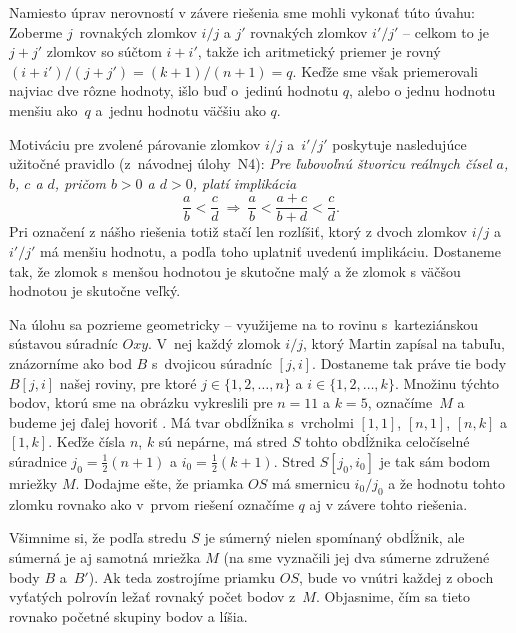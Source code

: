 {\poznamky
Namiesto úprav nerovností v závere riešenia sme mohli vykonať túto úvahu:
Zoberme $j$~rovnakých zlomkov $i/j$ a $j'$ rovnakých zlomkov $i'/j'$ --
celkom to je $j+j'$ zlomkov so súčtom $i+i'$, takže ich aritmetický priemer
je rovný $(i+i')/(j+j')=(k+1)/(n+1)=q$.
Keďže sme však priemerovali najviac dve rôzne hodnoty,
išlo buď o~jedinú hodnotu $q$, alebo o jednu hodnotu menšiu ako~$q$
a~jednu hodnotu väčšiu ako $q$.

Motiváciu pre zvolené párovanie zlomkov $i/j$ a~$i'/j'$
poskytuje nasledujúce užitočné pravidlo (z~návodnej úlohy~N4):
{\sl Pre ľubovoľnú štvoricu reálnych čísel $a$, $b$, $c$ a $d$, pričom $b>0$ a $d>0$, platí implikácia
}
\def\impl{\ \Rightarrow\ }
$$
\frac{a}{b}<\frac{c}{d}\impl
\frac{a}{b}<\frac{a+c}{b+d}<\frac{c}{d}.
$$
Pri označení z nášho riešenia totiž stačí len rozlíšiť, ktorý z dvoch zlomkov $i/j$ a~$i'/j'$ má menšiu hodnotu, a podľa toho
uplatniť uvedenú implikáciu. Dostaneme tak, že zlomok s menšou
hodnotou je skutočne malý a že zlomok s väčšou hodnotou
je skutočne veľký.

   \Jres
Na úlohu sa pozrieme geometricky -- využijeme na to rovinu
s~karteziánskou sústavou súradníc $Oxy$. V~nej každý
zlomok $i/j$, ktorý Martin zapísal na tabuľu, znázorníme ako bod $B$
s~dvojicou súradníc $[j,i]$.
Dostaneme tak práve tie body $B[j,i]$ našej roviny,
pre ktoré $j\in\{1,2,\dots,n\}$ a $i\in\{1,2,\dots,k\}$.
Množinu týchto bodov, ktorú sme na obrázku vykreslili pre $n=11$ a
$k=5$,
označíme~$M$ a budeme jej ďalej hovoriť . Má tvar obdĺžnika
s~vrcholmi $[1,1]$, $[n,1]$, $[n,k]$ a $[1,k]$. Keďže čísla
$n$, $k$ sú nepárne, má stred $S$ tohto obdĺžnika celočíselné
súradnice $j_0=\frac12(n+1)$ a $i_0=\frac12(k+1)$.
Stred $S[j_0,i_0]$ je tak sám bodom mriežky $M$. Dodajme ešte,
že priamka $OS$ má smernicu $i_0/j_0$ a že hodnotu tohto zlomku
rovnako ako v~prvom riešení označíme $q$ aj v závere tohto riešenia.
%

Všimnime si, že podľa stredu $S$ je súmerný nielen spomínaný
obdĺžnik, ale súmerná je aj samotná mriežka $M$ (na \obr{} sme
vyznačili jej dva súmerne združené body $B$ a~$B'$). Ak teda zostrojíme priamku $OS$,
bude vo vnútri každej z oboch vyťatých polrovín ležať rovnaký počet
bodov z~$M$. Objasnime, čím sa tieto rovnako početné skupiny bodov
 a  líšia.

}
